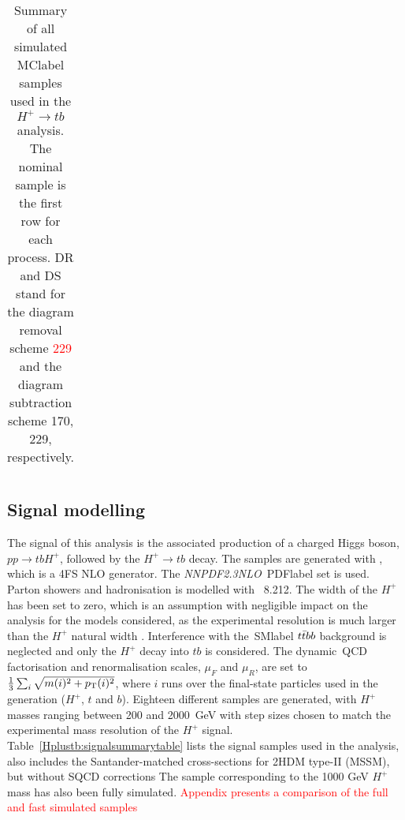\begin{table}[htbp]
\begin{tabular}{llllll}
    \bottomrule\bottomrule                               
    \end{tabular}
    \caption{Summary of all simulated \acrshort{MClabel} samples used in the $H^+\to tb$ analysis. The nominal sample is the first row for each process. DR and DS stand for the diagram removal scheme \textcolor{red}{229} and the diagram
    subtraction scheme 170, 229, respectively.}
    \label{Hplustb:MCsummarytable}
\end{table}


\subsection{Signal modelling}


The signal of this analysis is the associated production of a charged Higgs boson, $pp\to tb H^+$, followed by the $H^+\to tb$ decay. The samples are generated with \MGMCatNLO, which is a 4FS NLO generator. The \textit{NNPDF2.3NLO}~\acrshort{PDFlabel} set is used. Parton showers and hadronisation is modelled with \PYTHIA~8.212. The width of the $H^+$ has been set to zero, which is an assumption with negligible impact
on the analysis for the models considered, as the experimental resolution is much larger than the $H^+$ natural width %
. Interference with the~\acrshort{SMlabel} $t\bar{t} bb$ background is neglected and only the $H^+$ decay into $tb$ is considered. The dynamic~\acrshort{QCD} factorisation and renormalisation scales, $\mu_F$ and $\mu_R$, are set to $\frac{1}{3}\sum_i\sqrt{m(i)^2+p_{\text{T}}(i)^2}$, where $i$ runs over the final-state particles used in the generation ($H^+$, $t$ and $b$). Eighteen different samples are generated, with $H^+$ masses ranging between 200 and 2000~GeV with step sizes chosen to match the experimental mass resolution of the $H^+$ signal. Table~\ref{Hplustb:signalsummarytable} lists the signal samples used in the analysis, also includes the Santander-matched cross-sections for 2HDM type-II (MSSM), but without SQCD corrections %
The sample corresponding to the 1000 GeV $H^+$ mass has also been fully simulated. \textcolor{red}{Appendix presents a comparison of the full and fast simulated samples}

